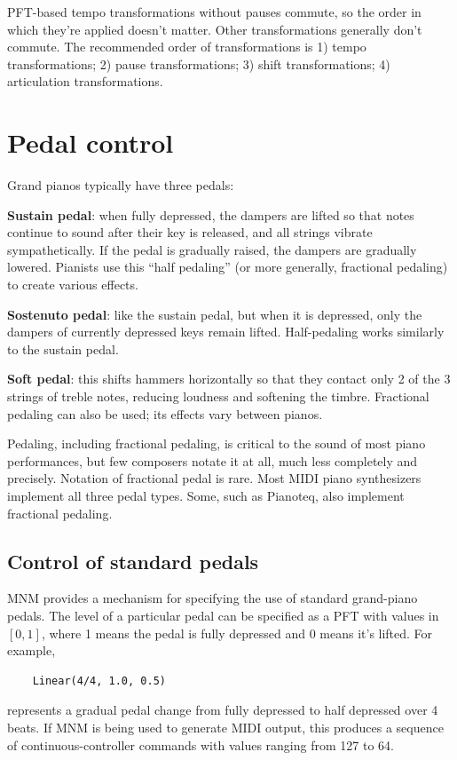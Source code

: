 \documentclass[letterpaper, 12pt]{article}
\begin{document}
PFT-based tempo transformations without pauses commute,
so the order in which they're applied doesn't matter.
Other transformations generally don't commute.
The recommended order of transformations is
1) tempo transformations;
2) pause transformations;
3) shift transformations;
4) articulation transformations.

\section{Pedal control}

Grand pianos typically have three pedals:

\textbf{Sustain pedal}: when fully depressed,
the dampers are lifted so that
notes continue to sound after their key is released,
and all strings vibrate sympathetically.
If the pedal is gradually raised, the dampers are gradually lowered.
Pianists use this ``half pedaling'' (or more generally, fractional pedaling)
to create various effects.

\textbf{Sostenuto pedal}: like the sustain pedal,
but when it is depressed, only the dampers
of currently depressed keys remain lifted.
Half-pedaling works similarly to the sustain pedal.

\textbf{Soft pedal}: this shifts hammers horizontally so that they
contact only 2 of the 3 strings of treble notes,
reducing loudness and softening the timbre.
Fractional pedaling can also be used; its effects vary between pianos.

Pedaling, including fractional pedaling,
is critical to the sound of most piano performances,
but few composers notate it at all, much less completely and precisely.
Notation of fractional pedal is rare.
Most MIDI piano synthesizers implement all three pedal types.
Some, such as Pianoteq, also implement fractional pedaling.

\subsection{Control of standard pedals}

MNM provides a mechanism for specifying the use
of standard grand-piano pedals.
The level of a particular pedal can be specified as a PFT
with values in $ [0,1] $,
where 1 means the pedal is fully depressed and 0 means it's lifted.
For example,
\begin{small}\begin{singlespace}\vspace{-18px}\begin{verbatim}
    Linear(4/4, 1.0, 0.5)
\end{verbatim}\end{singlespace}\end{small}\vspace{-18px}\noindent
represents a gradual pedal change from fully depressed to half depressed
over 4 beats.
If MNM is being used to generate MIDI output, this produces
a sequence of continuous-controller commands
with values ranging from 127 to 64.
\end{document}
